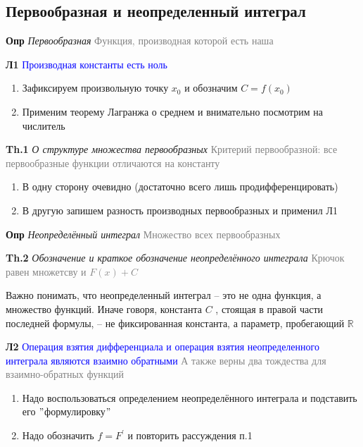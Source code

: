 \subsection{Первообразная и неопределенный интеграл}

\textbf{Опр} \textit{Первообразная} \textcolor{gray}{Функция, производная которой есть наша}

\textbf{Л1} \textcolor{blue}{Производная константы есть ноль}

\begin{enumerate}
    \item Зафиксируем произвольную точку $x_0$ и обозначим $C = f(x_0)$
    \item Применим теорему Лагранжа о среднем и внимательно посмотрим на числитель
\end{enumerate}

\textbf{Th.1} \textit{О структуре множества первообразных} \textcolor{gray}{Критерий первообразной: все
первообразные функции отличаются на константу}

\begin{enumerate}
    \item В одну сторону очевидно (достаточно всего лишь продифференцировать)
    \item В другую запишем разность производных первообразных и применил Л1
\end{enumerate}

\textbf{Опр} \textit{Неопределённый интеграл} \textcolor{gray}{Множество всех первообразных}

\textbf{Th.2} \textit{Обозначение и краткое обозначение неопределённого интеграла} \textcolor{gray}{Крючок равен
множетсву и $F(x) + C$}

Важно понимать, что неопределенный интеграл – это не одна функция, а множество функций.
Иначе говоря, константа $C$ , стоящая в правой части последней формулы, – не фиксированная константа, а параметр,
пробегающий $\mathbb{R}$

\textbf{Л2} \textcolor{blue}{Операция взятия дифференциала и операция взятия неопределенного интеграла являются
взаимно обратными} \textcolor{gray}{А также верны два тождества для взаимно-обратных функций}

\begin{enumerate}
    \item Надо воспользоваться определением неопределённого интеграла и подставить его \("\)формулировку\("\)
    \item Надо обозначить $f = F^{'}$ и повторить рассуждения п.1
\end{enumerate}


